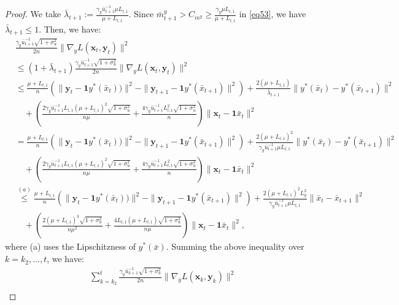 \documentclass{article}
\theoremstyle{plain}
\theoremstyle{definition}
\theoremstyle{remark}
\begin{document}
\begin{proof}
We take \(\bar{\lambda}_{t+1} := \frac{\gamma_y\bar{u}^{-1}_{t+1} \mu L_{l,1}}{\mu + L_{l,1}}\). Since \(\bar{m}^y_{t+1} > C_{m^y} \geq \frac{\gamma_y \mu L_{l,1}}{\mu + L_{l,1}}\) in \cref{eq53}, we have \(\bar{\lambda}_{t+1} \leq 1\). Then, we have:
\begin{align}
&\frac{\gamma_y\bar{u}^{-1}_{t+1}\sqrt{1+\sigma_u^2}}{2n} \|\nabla_y L(\mathbf{x}_t, \mathbf{y}_t)\|^2\nonumber\\
&\leq (1 + \bar{\lambda}_{t+1}) \frac{\gamma_y\bar{u}^{-1}_{t+1}\sqrt{1+\sigma_u^2}}{2n} \|\nabla_y L(\mathbf{x}_t, \mathbf{y}_t)\|^2  \nonumber \\
&\leq \frac{\mu + L_{l,1}}{n} \left( \|\mathbf{y}_{t} - \mathbf{1}y^*(\bar{x}_t))\|^2
- \|\mathbf{y}_{t+1} - \mathbf{1}y^*(\bar{x}_{t+1})\|^2 \right) + \frac{2 (\mu + L_{l,1}) }{\bar{\lambda}_{t+1}} \|y^*(\bar{x}_t) - y^*(\bar{x}_{t+1})\|^2 \nonumber\\
&\quad +\left(\frac{2\gamma_y\bar{u}_{t+1}^{-1}L_{l,1}(\mu+L_{l,1})^2\sqrt{1+\sigma_u^2}}{n\mu }+\frac{4\gamma_y\bar{u}_{t+1}^{-1}L_{l,1}^2\sqrt{1+\sigma_u^2}}{n}\right) \|\mathbf{x}_t-\mathbf{1}\bar{x}_t\|^2\nonumber \\
&= \frac{\mu + L_{l,1}}{n} \left( \|\mathbf{y}_{t} - \mathbf{1}y^*(\bar{x}_t))\|^2
- \|\mathbf{y}_{t+1} - \mathbf{1}y^*(\bar{x}_{t+1})\|^2 \right)+ \frac{2(\mu + L_{l,1})^2}{\gamma_y\bar{u}^{-1}_{t+1} \mu L_{l,1}} \|y^*(\bar{x}_t) - y^*(\bar{x}_{t+1})\|^2 \nonumber\\
&\quad+\left(\frac{2\gamma_y\bar{u}_{t+1}^{-1}L_{l,1}(\mu+L_{l,1})^2\sqrt{1+\sigma_u^2}}{n\mu }+\frac{4\gamma_y\bar{u}_{t+1}^{-1}L_{l,1}^2\sqrt{1+\sigma_u^2}}{n}\right) \|\mathbf{x}_t-\mathbf{1}\bar{x}_t\|^2\nonumber \\
&\overset{(a)}{\leq} \frac{\mu + L_{l,1}}{n} \left( \|\mathbf{y}_{t} - \mathbf{1}y^*(\bar{x}_t))\|^2
- \|\mathbf{y}_{t+1} - \mathbf{1}y^*(\bar{x}_{t+1})\|^2 \right)+ \frac{2(\mu + L_{l,1})^2L_y^2}{\gamma_y\bar{u}^{-1}_{t+1} \mu L_{l,1}} \|\bar{x}_t -\bar{x}_{t+1}\|^2 \nonumber\\
&\quad+\left(\frac{2(\mu+L_{l,1})^3\sqrt{1+\sigma_u^2}}{n\mu^2 }+\frac{4L_{l,1}(\mu+L_{l,1})\sqrt{1+\sigma_u^2}}{n\mu }\right) \|\mathbf{x}_t-\mathbf{1}\bar{x}_t\|^2,\label{eq66}
\end{align}
where (a) uses the Lipschitzness of \(y^*(\bar{x})\). Summing the above inequality over \(k = k_2, \dots, t\), we have:
\begin{align}
&\sum_{k=k_2}^t \frac{\gamma_y\bar{u}^{-1}_{k+1}\sqrt{1+\sigma_u^2}}{2n} \|\nabla_y L(\mathbf{x}_k, \mathbf{y}_k)\|^2\nonumber\\

\end{align}
\end{proof}
\end{document}
